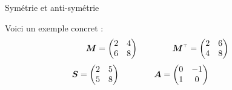 \documentclass[french]{beamer}
\begin{document}
\begin{frame}{Symétrie et anti-symétrie}

\begin{example}

Voici un exemple concret :
\[
\matM = \begin{pmatrix}
2 & 4 \\ 6 & 8
\end{pmatrix}
\qquad\qquad
\transp{\matM} = \begin{pmatrix}
2 & 6 \\ 4 & 8
\end{pmatrix}
\]
\[
\boldsymbol{S} = \begin{pmatrix}
2 & 5 \\ 5 & 8
\end{pmatrix}
\qquad\qquad
\boldsymbol{A} = \begin{pmatrix}
0 & -1 \\ 1 & 0
\end{pmatrix}
\qquad\qquad
\]

\end{example}
\end{frame}
\end{document}
